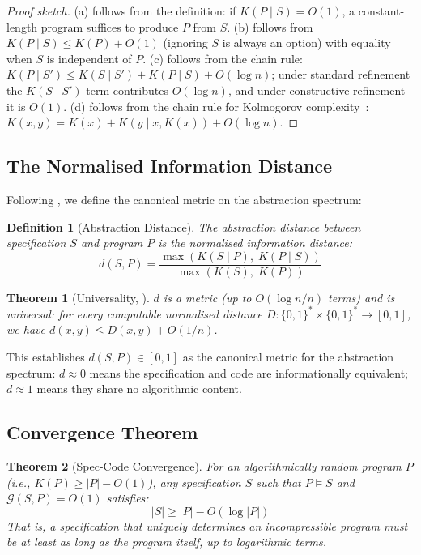 \documentclass[11pt, a4paper, copyright]{googledeepmind}
\newtheorem{definition}{Definition}[section]
\newtheorem{theorem}{Theorem}[section]
\begin{document}
\begin{proof}[Proof sketch]
(a) follows from the definition: if $K(P \mid S) = O(1)$, a constant-length program suffices to produce $P$ from $S$. (b) follows from $K(P \mid S) \leq K(P) + O(1)$ (ignoring $S$ is always an option) with equality when $S$ is independent of $P$. (c) follows from the chain rule: $K(P \mid S') \leq K(S \mid S') + K(P \mid S) + O(\log n)$; under standard refinement the $K(S \mid S')$ term contributes $O(\log n)$, and under constructive refinement it is $O(1)$. (d) follows from the chain rule for Kolmogorov complexity~\citep{kolmogorov1965three}: $K(x, y) = K(x) + K(y \mid x, K(x)) + O(\log n)$.
\end{proof}

\subsection{The Normalised Information Distance}

Following \citet{li2004similarity}, we define the canonical metric on the abstraction spectrum:

\begin{definition}[Abstraction Distance]
The \emph{abstraction distance} between specification $S$ and program $P$ is the normalised information distance:
\begin{equation}
    d(S, P) = \frac{\max(K(S \mid P),\; K(P \mid S))}{\max(K(S),\; K(P))}
\end{equation}
\end{definition}

\begin{theorem}[Universality, \citealp{li2004similarity}]
\label{thm:nid}
$d$ is a metric (up to $O(\log n / n)$ terms) and is \emph{universal}: for every computable normalised distance $D: \{0,1\}^* \times \{0,1\}^* \to [0,1]$, we have $d(x, y) \leq D(x, y) + O(1/n)$.
\end{theorem}

This establishes $d(S, P) \in [0, 1]$ as the canonical metric for the abstraction spectrum: $d \approx 0$ means the specification and code are informationally equivalent; $d \approx 1$ means they share no algorithmic content.

\subsection{Convergence Theorem}

\begin{theorem}[Spec-Code Convergence]
\label{thm:convergence}
For an algorithmically random program $P$ (i.e., $K(P) \geq |P| - O(1)$), any specification $S$ such that $P \models S$ and $\mathcal{G}(S, P) = O(1)$ satisfies:
\begin{equation}
    |S| \geq |P| - O(\log |P|)
\end{equation}
That is, a specification that uniquely determines an incompressible program must be at least as long as the program itself, up to logarithmic terms.
\end{theorem}
\end{document}
